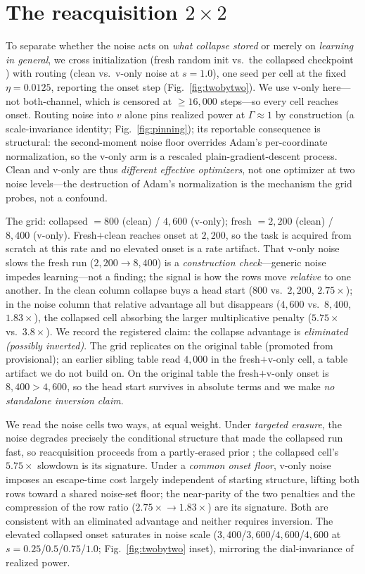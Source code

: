 \section{The reacquisition $2\times2$}
\label{sec:twobytwo}

To separate whether the noise acts on \emph{what collapse stored} or merely on
\emph{learning in general}, we cross initialization (fresh random init vs.\ the
collapsed checkpoint \citep{stochcollapse}) with routing (clean vs.\ v-only noise
at $s{=}1.0$), one seed per cell at the fixed $\eta{=}0.0125$, reporting the onset
step (Fig.~\ref{fig:twobytwo}). We use v-only here---not both-channel, which is
censored at ${\ge}16{,}000$ steps---so every cell reaches onset. Routing noise
into $v$ alone pins realized power at $\Gamma\approx1$ by construction (a
scale-invariance identity; Fig.~\ref{fig:pinning}); its reportable consequence is
structural: the second-moment noise floor overrides Adam's per-coordinate
normalization, so the v-only arm is a rescaled plain-gradient-descent process.
Clean and v-only are thus \emph{different effective optimizers}, not one optimizer
at two noise levels---the destruction of Adam's normalization is the mechanism the
grid probes, not a confound.

The grid: collapsed $=800$ (clean) / $4{,}600$ (v-only); fresh $=2{,}200$ (clean)
/ $8{,}400$ (v-only). Fresh$+$clean reaches onset at $2{,}200$, so the task is
acquired from scratch at this rate and no elevated onset is a rate artifact. That
v-only noise slows the fresh run ($2{,}200\!\to\!8{,}400$) is a \emph{construction
check}---generic noise impedes learning---not a finding; the signal is how the
rows move \emph{relative} to one another. In the clean column collapse buys a
head start ($800$ vs.\ $2{,}200$, $2.75\times$); in the noise column that relative
advantage all but disappears ($4{,}600$ vs.\ $8{,}400$, $1.83\times$), the
collapsed cell absorbing the larger multiplicative penalty ($5.75\times$ vs.\
$3.8\times$). We record the registered claim: the collapse advantage is
\emph{eliminated (possibly inverted)}. The grid replicates on the original table
(promoted from provisional); an earlier sibling table read $4{,}000$ in the
fresh$+$v-only cell, a table artifact we do not build on. On the original table
the fresh$+$v-only onset is $8{,}400>4{,}600$, so the head start survives in
absolute terms and we make \emph{no standalone inversion claim}.

We read the noise cells two ways, at equal weight. Under \emph{targeted erasure},
the noise degrades precisely the conditional structure that made the collapsed run
fast, so reacquisition proceeds from a partly-erased prior \citep{dohare}; the
collapsed cell's $5.75\times$ slowdown is its signature. Under a \emph{common
onset floor}, v-only noise imposes an escape-time cost largely independent of
starting structure, lifting both rows toward a shared noise-set floor; the
near-parity of the two penalties and the compression of the row ratio
($2.75\times\!\to\!1.83\times$) are its signature. Both are consistent with an
eliminated advantage and neither requires inversion. The elevated collapsed onset
saturates in noise scale ($3{,}400$/$3{,}600$/$4{,}600$/$4{,}600$ at
$s{=}0.25$/$0.5$/$0.75$/$1.0$; Fig.~\ref{fig:twobytwo} inset), mirroring the
dial-invariance of realized power.
